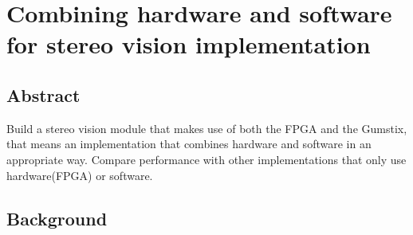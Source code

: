 \chapter{Combining hardware and software for stereo vision implementation}
\label{ch:five}
\section{Abstract}
Build a stereo vision module that makes use of both the FPGA and the Gumstix, that means an implementation that combines hardware 
and software in an appropriate way. Compare performance with other implementations that only use hardware(FPGA) or software. 

\section{Background}
